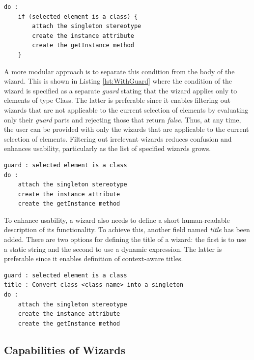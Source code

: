 \begin{lstlisting}[float=tbp, caption=The wizard of Listing \ref{lst:Basic} enhanced with an $if$ condition, label=lst:WithoutGuard, language=EWL]
do : 
	if (selected element is a class) {
		attach the singleton stereotype
		create the instance attribute
		create the getInstance method
	}
\end{lstlisting}

A more modular approach is to separate this condition from the body of the wizard. This is shown in Listing \ref{lst:WithGuard} where the condition of the wizard is specified as a separate \emph{guard} stating that the wizard applies only to elements of type Class. The latter is preferable since it enables filtering out wizards that are not applicable to the current selection of elements by evaluating only their \emph{guard} parts and rejecting those that return \emph{false}. Thus, at any time, the user can be provided with only the wizards that are applicable to the current selection of elements. Filtering out irrelevant wizards reduces confusion and enhances usability, particularly as the list of specified wizards grows.

\begin{lstlisting}[float=tbp, caption=The wizard of Listing \ref{lst:WithoutGuard} with an explicit $guard$ instead of the $if$ condition, label=lst:WithGuard, language=EWL]
guard : selected element is a class
do : 
	attach the singleton stereotype
	create the instance attribute
	create the getInstance method
\end{lstlisting}

To enhance usability, a wizard also needs to define a short human-readable description of its functionality. To achieve this, another field named \emph{title} has been added. There are two options for defining the title of a wizard: the first is to use a static string and the second to use a dynamic expression. The latter is preferable since it enables definition of context-aware titles.

\begin{lstlisting}[float=tbp, caption=The wizard of Listing \ref{lst:WithGuard} enhanced with a $title$ part, label=lst:FinalForm, language=EWL]
guard : selected element is a class
title : Convert class <class-name> into a singleton
do : 
	attach the singleton stereotype
	create the instance attribute
	create the getInstance method
\end{lstlisting}

\subsection{Capabilities of Wizards}

